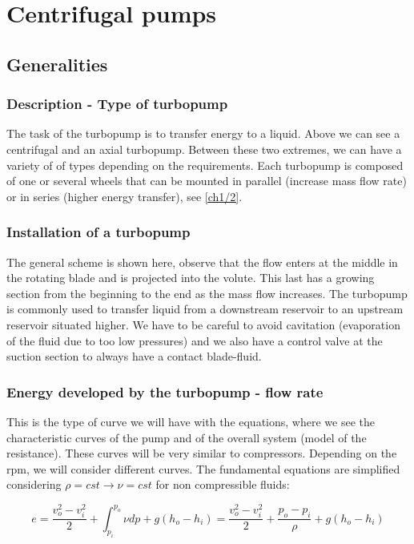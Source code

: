 
\chapter{Centrifugal pumps}
\section{Generalities}
\subsection{Description - Type of turbopump}
The task of the turbopump is to transfer energy to a liquid. Above we can see a centrifugal and an axial turbopump. Between these two extremes, we can have a variety of of types depending on the requirements. Each turbopump is composed of one or several wheels that can be mounted in parallel (increase mass flow rate) or in series (higher energy transfer), see \autoref{ch1/2}. 

\subsection{Installation of a turbopump}
The general scheme is shown here, observe that the flow enters at the middle in the rotating blade and is projected into the volute. This last has a growing section from the beginning to the end as the mass flow increases. The turbopump is commonly used to transfer liquid from a downstream reservoir to an upstream reservoir situated higher. We have to be careful to avoid cavitation (evaporation of the fluid due to too low pressures) and we also have a control valve at the suction section to always have a contact blade-fluid.

\subsection{Energy developed by the turbopump - flow rate}
This is the type of curve we will have with the equations, where we see the characteristic curves of the pump and of the overall system (model of the resistance). These curves will be very similar to compressors. Depending on the rpm, we will consider different curves. The fundamental equations are simplified considering $\rho = cst \rightarrow \nu = cst$ for non compressible fluids: 

\begin{equation}
e = \frac{v_o^2 - v_i^2}{2} + \int _{p_i}^{p_o} \nu dp + g(h_o - h_i) = \frac{v_o^2 - v_i^2}{2} + \frac{p_o-p_i}{\rho} + g(h_o - h_i)
\end{equation}

